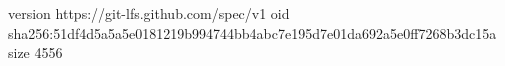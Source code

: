 version https://git-lfs.github.com/spec/v1
oid sha256:51df4d5a5a5e0181219b994744bb4abc7e195d7e01da692a5e0ff7268b3dc15a
size 4556
